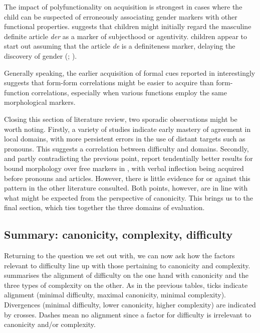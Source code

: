 \documentclass[output=collectionpaper]{langsci/langscibook}
\begin{document}
The impact of polyfunctionality on acquisition is strongest in cases where the child can be suspected of erroneously associating gender markers with other functional properties. \citet{Bittner2002} suggests that  children might initially regard the masculine definite article \textit{der} as a marker of subjecthood or agentivity.  children appear to start out assuming that the  article \textit{de} is a definiteness marker, delaying the discovery of gender (\citealt{Keij2012}; \citealt{Cornips2008}).

Generally speaking, the earlier acquisition of formal cues reported in  interestingly suggests that form-form correlations might be easier to acquire than form-function correlations, especially when various functions employ the same morphological markers.

Closing this section of literature review, two sporadic observations might be worth noting. Firstly, a variety of studies indicate early mastery of agreement in local domains, with more persistent errors in the use of distant targets such as pronouns. This suggests a correlation between difficulty and domains. Secondly, and partly contradicting the previous point, \citet[545]{Pizzuto1992} report tendentially better results for bound morphology over free markers in , with verbal inflection being acquired before pronouns and articles. However, there is little evidence for or against this pattern in the other literature consulted. Both points, however, are in line with what might be expected from the perspective of canonicity. This brings us to the final section, which ties together the three domains of evaluation.

\subsection{Summary: canonicity, complexity, difficulty}
\label{sec:Audr:4.3}

Returning to the question we set out with, we can now ask how the factors relevant to difficulty line up with those pertaining to canonicity and complexity.  summarises the alignment of difficulty on the one hand with canonicity and the three types of complexity on the other. As in the previous tables, ticks indicate alignment (minimal difficulty, maximal canonicity, minimal complexity). Divergences (minimal difficulty, lower canonicity, higher complexity) are indicated by crosses. Dashes mean no alignment since a factor for difficulty is irrelevant to canonicity and/or complexity.
\end{document}

